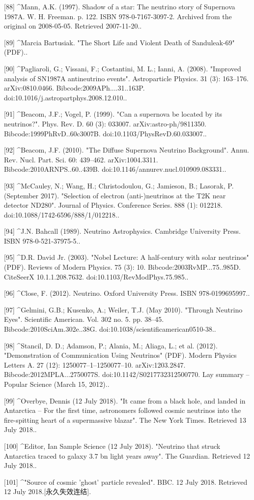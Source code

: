 [88]
^Mann, A.K. (1997). Shadow of a star: The neutrino story of Supernova 1987A. W. H. Freeman. p. 122. ISBN 978-0-7167-3097-2. Archived from the original on 2008-05-05. Retrieved 2007-11-20..

[89]
^Marcia Bartusiak. "The Short Life and Violent Death of Sanduleak-69" (PDF)..

[90]
^Pagliaroli, G.; Vissani, F.; Costantini, M. L.; Ianni, A. (2008). "Improved analysis of SN1987A antineutrino events". Astroparticle Physics. 31 (3): 163–176. arXiv:0810.0466. Bibcode:2009APh....31..163P. doi:10.1016/j.astropartphys.2008.12.010..

[91]
^Beacom, J.F.; Vogel, P. (1999). "Can a supernova be located by its neutrinos?". Phys. Rev. D. 60 (3): 033007. arXiv:astro-ph/9811350. Bibcode:1999PhRvD..60c3007B. doi:10.1103/PhysRevD.60.033007..

[92]
^Beacom, J.F. (2010). "The Diffuse Supernova Neutrino Background". Annu. Rev. Nucl. Part. Sci. 60: 439–462. arXiv:1004.3311. Bibcode:2010ARNPS..60..439B. doi:10.1146/annurev.nucl.010909.083331..

[93]
^McCauley, N.; Wang, H.; Christodoulou, G.; Jamieson, B.; Lasorak, P. (September 2017). "Selection of electron (anti-)neutrinos at the T2K near detector ND280". Journal of Physics. Conference Series. 888 (1): 012218. doi:10.1088/1742-6596/888/1/012218..

[94]
^J.N. Bahcall (1989). Neutrino Astrophysics. Cambridge University Press. ISBN 978-0-521-37975-5..

[95]
^D.R. David Jr. (2003). "Nobel Lecture: A half-century with solar neutrinos" (PDF). Reviews of Modern Physics. 75 (3): 10. Bibcode:2003RvMP...75..985D. CiteSeerX 10.1.1.208.7632. doi:10.1103/RevModPhys.75.985..

[96]
^Close, F. (2012). Neutrino. Oxford University Press. ISBN 978-0199695997..

[97]
^Gelmini, G.B.; Kusenko, A.; Weiler, T.J. (May 2010). "Through Neutrino Eyes". Scientific American. Vol. 302 no. 5. pp. 38–45. Bibcode:2010SciAm.302e..38G. doi:10.1038/scientificamerican0510-38..

[98]
^Stancil, D. D.; Adamson, P.; Alania, M.; Aliaga, L.; et al. (2012). "Demonstration of Communication Using Neutrinos" (PDF). Modern Physics Letters A. 27 (12): 1250077–1–1250077–10. arXiv:1203.2847. Bibcode:2012MPLA...2750077S. doi:10.1142/S0217732312500770. Lay summary – Popular Science (March 15, 2012)..

[99]
^Overbye, Dennis (12 July 2018). "It came from a black hole, and landed in Antarctica – For the first time, astronomers followed cosmic neutrinos into the fire-spitting heart of a supermassive blazar". The New York Times. Retrieved 13 July 2018..

[100]
^Editor, Ian Sample Science (12 July 2018). "Neutrino that struck Antarctica traced to galaxy 3.7 bn light years away". The Guardian. Retrieved 12 July 2018..

[101]
^"Source of cosmic 'ghost' particle revealed". BBC. 12 July 2018. Retrieved 12 July 2018.[永久失效连结].